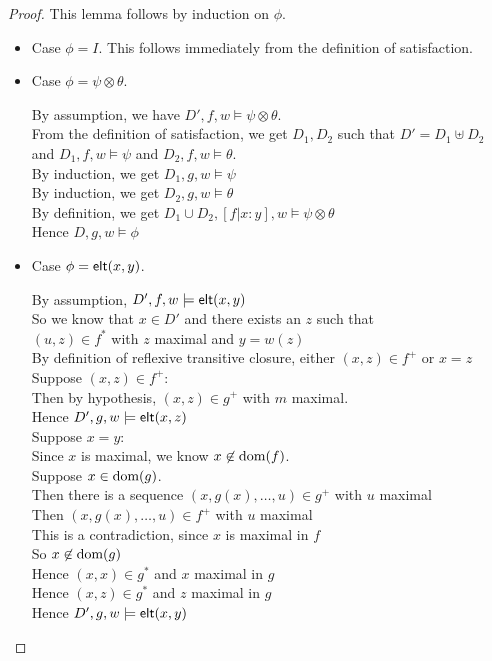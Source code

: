 \begin{proof}
This lemma follows by induction on $\phi$. 
\begin{itemize}
\item Case $\phi = I$. This follows immediately from the definition of satisfaction. 
\item Case $\phi = \psi \otimes \theta$. 
  \begin{tabbedproof}
    \oo By assumption, we have $D', f, w \models \psi \otimes \theta$. \\
    \ooo From the definition of satisfaction, we get  $D_1, D_2$ such that $D' = D_1 \uplus D_2$ \\
    \oox and $D_1, f, w \models \psi$ and $D_2, f, w \models \theta$.  \\
    \ooo By induction, we get $D_1, g, w \models \psi$ \\
    \ooo By induction, we get $D_2, g, w \models \theta$ \\
    \ooo By definition, we get $D_1 \cup D_2, [f|x:y], w \models \psi \otimes \theta$ \\
    \ooo Hence $D, g, w \models \phi$ \\
  \end{tabbedproof}
\item Case $\phi = \mathsf{elt}({x}, {y})$.
  \begin{tabbedproof}
    \oo By assumption, $D', f, w \models \mathsf{elt}({x}, {y})$ \\
    \oo So we know that $x \in D'$ and there exists an $z$ such that \\
    \ox $(u,z) \in f^*$ with $z$ maximal and $y = w(z)$ \\
    \oo By definition of reflexive transitive closure, either $(x, z) \in f^+$ or $x = z$ \\
    \oo Suppose $(x,z) \in f^+$:\\
    \ooo Then by hypothesis, $(x,z) \in g^+$ with $m$ maximal.  \\
    \ooo Hence $D', g, w \models \mathsf{elt}({x}, {z})$  \\
    \oo Suppose $x = y$: \\
    \ooo Since $x$ is maximal, we know $x \not\in \mbox{dom}({f})$. \\
    \ooo Suppose $x \in \mbox{dom}({g})$. \\
    \oooo Then there is a sequence $(x, g(x), \ldots, u) \in g^+$ with $u$ maximal \\
    \oooo Then $(x, g(x), \ldots, u) \in f^+$ with $u$ maximal \\
    \oooo This is a contradiction, since $x$ is maximal in $f$ \\
    \ooo So $x \not\in \mbox{dom}({g})$ \\
    \ooo Hence $(x, x) \in g^*$ and $x$ maximal in $g$ \\
    \ooo Hence $(x, z) \in g^*$ and $z$ maximal in $g$ \\
    \ooo Hence $D', g, w \models \mathsf{elt}({x}, {y})$
  \end{tabbedproof}
\end{itemize}
\end{proof}


